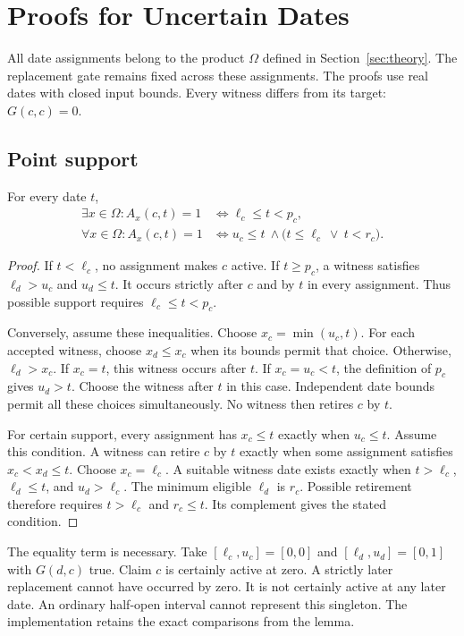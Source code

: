 \section{Proofs for Uncertain Dates}
\label{app:uncertain-proofs}

All date assignments belong to the product $\Omega$ defined in Section~\ref{sec:theory}.
The replacement gate remains fixed across these assignments.
The proofs use real dates with closed input bounds.
Every witness differs from its target: $G(c,c)=0$.

\subsection{Point support}
\begin{lemma}
\label{lem:uncertain-point}
For every date $t$,
\begin{align}
 \exists x\in\Omega:A_x(c,t)=1
 &\iff \ell_c\leq t<p_c,\\
 \forall x\in\Omega:A_x(c,t)=1
 &\iff u_c\leq t\ \land\bigl(t\leq\ell_c\ \lor\ t<r_c\bigr).
\end{align}
\end{lemma}
\begin{proof}
If $t<\ell_c$, no assignment makes $c$ active.
If $t\geq p_c$, a witness satisfies $\ell_d>u_c$ and $u_d\leq t$.
It occurs strictly after $c$ and by $t$ in every assignment.
Thus possible support requires $\ell_c\leq t<p_c$.

Conversely, assume these inequalities.
Choose $x_c=\min(u_c,t)$.
For each accepted witness, choose $x_d\leq x_c$ when its bounds permit that choice.
Otherwise, $\ell_d>x_c$.
If $x_c=t$, this witness occurs after $t$.
If $x_c=u_c<t$, the definition of $p_c$ gives $u_d>t$.
Choose the witness after $t$ in this case.
Independent date bounds permit all these choices simultaneously.
No witness then retires $c$ by $t$.

For certain support, every assignment has $x_c\leq t$ exactly when $u_c\leq t$.
Assume this condition.
A witness can retire $c$ by $t$ exactly when some assignment satisfies $x_c<x_d\leq t$.
Choose $x_c=\ell_c$.
A suitable witness date exists exactly when
$t>\ell_c$, $\ell_d\leq t$, and $u_d>\ell_c$.
The minimum eligible $\ell_d$ is $r_c$.
Possible retirement therefore requires $t>\ell_c$ and $r_c\leq t$.
Its complement gives the stated condition.
\end{proof}

The equality term is necessary.
Take $[\ell_c,u_c]=[0,0]$ and $[\ell_d,u_d]=[0,1]$ with $G(d,c)$ true.
Claim $c$ is certainly active at zero.
A strictly later replacement cannot have occurred by zero.
It is not certainly active at any later date.
An ordinary half-open interval cannot represent this singleton.
The implementation retains the exact comparisons from the lemma.

